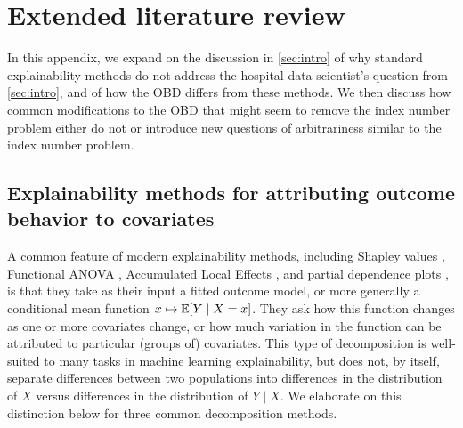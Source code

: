 \section{Extended literature review}
\label{appendix:lit_review_xAI}

In this appendix, we expand on the discussion in \cref{sec:intro} of why standard explainability methods do not address the hospital data scientist's question from \cref{sec:intro}, and of how the OBD differs from these methods.
We then discuss how common modifications to the OBD that might seem to remove the index number problem either do not or introduce new questions of arbitrariness similar to the index number problem.

\subsection{Explainability methods for attributing outcome behavior to covariates}
\label{appendix:xAI}

A common feature of modern explainability methods, including Shapley values \citep{Shapley1953, Lundberg2017, chen2025shapley}, Functional ANOVA \citep{stone1994, hooker2004discovering, hookerGeneralizedFunctionalANOVA2007, lengerich2020purifying, fumagalli2025fanova}, Accumulated Local Effects \citep{apley2020}, and partial dependence plots \citep{friedman2001greedy, liu2025trees}, is that they take as their input a fitted outcome model, or more generally a conditional mean function $x \mapsto \mathbb{E}[Y \mid X=x]$.
They ask how this function changes as one or more covariates change, or how much variation in the function can be attributed to particular (groups of) covariates.
This type of decomposition is well-suited to many tasks in machine learning explainability, but does not, by itself, separate differences between two populations into differences in the distribution of $X$ versus differences in the distribution of $Y \mid X$.
We elaborate on this distinction below for three common decomposition methods.

